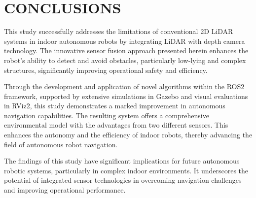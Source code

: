 \section{CONCLUSIONS}
\label{sec:conclusions}
This study successfully addresses the limitations of conventional 2D LiDAR systems in indoor autonomous robots 
by integrating LiDAR with depth camera technology. 
The innovative sensor fusion approach presented herein enhances the robot's ability to detect 
and avoid obstacles, particularly low-lying and complex structures, 
significantly improving operational safety and efficiency.

Through the development and application of novel algorithms within the ROS2 framework, 
supported by extensive simulations in Gazebo and visual evaluations in RViz2, 
this study demonstrates a marked improvement in autonomous navigation capabilities. 
The resulting system offers a comprehensive environmental model with the advantages from two different sensors. 
This enhances the autonomy and the efficiency of indoor robots, thereby advancing the field of autonomous robot navigation.

The findings of this study have significant implications for future autonomous robotic systems, 
particularly in complex indoor environments. 
It underscores the potential of integrated sensor technologies in overcoming navigation challenges and improving operational performance.